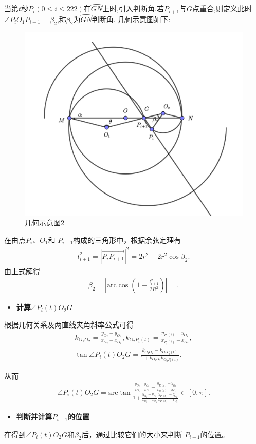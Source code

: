 \documentclass[../main.tex]{subfiles}
\begin{document}
\par 当第$t$秒$P_i(0\leq i\leq 222)$在$\wideparen{GN}$上时,引入判断角.若$P_{i+1}$与$G$点重合,则定义此时$\angle P_iO_1P_{i+1}=\beta_2$,称$\beta_2$为$\wideparen{GN}$判断角. 几何示意图如下:
\begin{figure}[H]
\centering
\includegraphics[width=.6\textwidth]{1}
\caption{几何示意图2}
\end{figure}
\par 在由点$ P_{i}、O_{1} $和 $P_{i + 1} $构成的三角形中，根据余弦定理有
\begin{align}\label{1.........448}
l_{i+1}^{2}=\left| \overrightarrow{P_iP_{i+1}} \right|^2=2r^2-2r^2\cos \beta _2.
\end{align}
由上式解得
\begin{align}\label{1.........449}
\beta _2=\left| \mathrm{arc}\cos \left( 1-\frac{l_{i+1}^{2}}{2R^2} \right) \right|=.
\end{align}

\begin{itemize}
\item \textbf{计算$\angle P_{i}(t)O_2G$}
\end{itemize}

\par 根据几何关系及两直线夹角斜率公式可得
\begin{gather}\label{1.........450}
k_{O_1O_2}=\frac{y_{O_2}-y_{O_1}}{x_{O_2}-x_{O_1}},k_{O_2P_i\left( t \right)}=\frac{y_{P_i\left( t \right)}-y_{O_2}}{x_{P_i\left( t \right)}-x_{O_2}},
\\
\tan \angle P_i(t)O_2G=\frac{k_{O_1O_2}-k_{O_2P_i\left( t \right)}}{1+k_{O_1O_2}k_{O_2P_i\left( t \right)}}.
\end{gather}
\par 从而
\begin{align}\label{1.........451}
\angle P_i(t)O_2G=\mathrm{arc}\tan \frac{\frac{y_{O_2}-y_{O_1}}{x_{O_2}-x_{O_1}}-\frac{y_{P_i\left( t \right)}-y_{O_2}}{x_{P_i\left( t \right)}-x_{O_2}}}{1+\frac{y_{O_2}-y_{O_1}}{x_{O_2}-x_{O_1}}\frac{y_{P_i\left( t \right)}-y_{O_2}}{x_{P_i\left( t \right)}-x_{O_2}}}\in[0,\pi].
\end{align}
\begin{itemize}
\item \textbf{判断并计算$P_{i+1}$的位置}
\end{itemize}
\par 在得到$\angle P_{i}(t)O_{2}G $和$\beta_{2} $后，通过比较它们的大小来判断 $P_{i + 1} $的位置。
\end{document}
